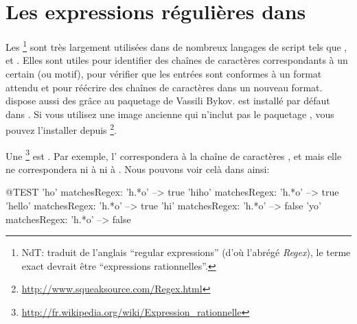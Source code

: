 \documentclass[a4paper,10pt,twoside]{book}
\begin{document}
\fi
\sloppy
\chapter{Les expressions régulières dans \pharo}


Les \expregs\footnote{NdT: traduit de l'anglais ``regular expressions''
  (d'où l'abrégé \emph{Regex}), le terme exact devrait être
  ``expressions rationnelles''.} sont très largement utilisées dans de
nombreux langages de script tels que ,  et
.
Elles sont utiles pour identifier des chaînes de caractères
correspondants à un certain \pattern (ou motif), pour vérifier que les
entrées sont conformes à un format attendu et pour réécrire des
chaînes de caractères dans un nouveau format.
\pharo dispose aussi des \expregs grâce au paquetage  de
Vassili Bykov.
\pkgregex est installé par défaut dans \pharo. Si vous utilisez une image
ancienne qui n'inclut pas le paquetage \pkgregex, vous pouvez
l'installer depuis \ind{\sqsrc}\footnote{\url{http://www.squeaksource.com/Regex.html}}.

Une \expreg\footnote{\url{http://fr.wikipedia.org/wiki/Expression_rationnelle}}
est .
Par exemple, l'\expreg  {} correspondera à la chaîne de
caractères ,  et  mais elle ne
correspondera ni à  ni à .
Nous pouvons voir celà dans \pharo ainsi:
\begin{code}{@TEST}
'ho' matchesRegex: 'h.*o'     --> true
'hiho' matchesRegex: 'h.*o'  --> true
'hello' matchesRegex: 'h.*o' --> true
'hi' matchesRegex: 'h.*o'      --> false
'yo' matchesRegex: 'h.*o'     --> false
\end{code}
\end{document}
